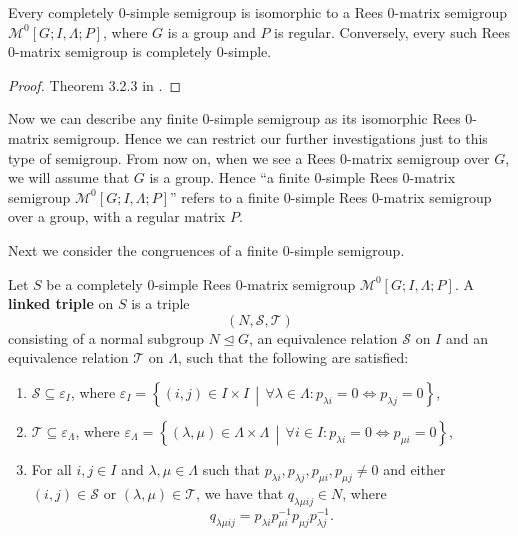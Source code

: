 \begin{theorem}[Rees]
  \label{thm:rees}
  Every completely 0-simple semigroup is isomorphic to a Rees 0-matrix semigroup
  $\mathcal{M}^0[G;I,\Lambda;P]$, where $G$ is a group and $P$ is regular.
  Conversely, every such Rees 0-matrix semigroup is completely 0-simple.
  \begin{proof}
    Theorem 3.2.3 in \cite[p.72-75]{howie}.
  \end{proof}
\end{theorem}

Now we can describe any finite 0-simple semigroup as its isomorphic Rees
0-matrix semigroup.  Hence we can restrict our further investigations just to
this type of semigroup.  From now on, when we see a Rees 0-matrix semigroup over
$G$, we will assume that $G$ is a group.  Hence ``a finite 0-simple Rees
0-matrix semigroup $\mathcal{M}^0[G;I,\Lambda;P]$'' refers to a finite 0-simple
Rees 0-matrix semigroup over a group, with a regular matrix $P$.

Next we consider the congruences of a finite 0-simple semigroup.

\begin{definition}
  \label{def:linked-triple}
  Let $S$ be a completely 0-simple Rees 0-matrix semigroup
  $\mathcal{M}^0[G;I,\Lambda;P]$.  A \textbf{linked triple} on $S$ is a
  triple $$(N,\mathcal{S},\mathcal{T})$$ consisting of a normal subgroup
  $N \trianglelefteq G$, an equivalence relation $\mathcal{S}$ on $I$ and an
  equivalence relation $\mathcal{T}$ on $\Lambda$, such that the following are
  satisfied:
  \begin{enumerate}
  \item $\mathcal{S} \subseteq \varepsilon_I$, where $\varepsilon_I =
    \left\{(i,j) \in I \times I\, \middle|\, \forall \lambda \in \Lambda:
      p_{\lambda i}=0 \iff p_{\lambda j}=0 \right\}$,
  \item $\mathcal{T} \subseteq \varepsilon_\Lambda$, where $\varepsilon_\Lambda
    = \left\{(\lambda,\mu) \in \Lambda \times \Lambda\, \middle|\, \forall i \in
      I: p_{\lambda i}=0 \iff p_{\mu i}=0 \right\}$,
  \item For all $i,j \in I$ and $\lambda, \mu \in \Lambda$ such that
    $p_{\lambda i}, p_{\lambda j}, p_{\mu i}, p_{\mu j} \neq 0$ and either
    $(i,j) \in \mathcal{S}$ or $(\lambda,\mu) \in \mathcal{T}$, we have that
    $q_{\lambda \mu i j} \in N$, where
    $$q_{\lambda \mu i j} = p_{\lambda i} p_{\mu i}^{-1} p_{\mu j} p_{\lambda
      j}^{-1}.$$
  \end{enumerate}
  \cite[p.86]{howie}
\end{definition}

